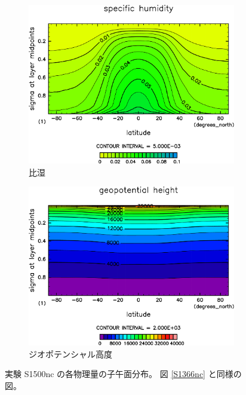 \documentclass[body]{subfiles}
\begin{document}
\begin{figure}[t]
\begin{subfigure}{.4\textwidth}
		\includegraphics[width=\textwidth]{S1500-nc/QH2OVap,time=3650:4015-crop-rotate.pdf}
		\caption{比湿\hmu*{[kg/kg]}}\label{S1500nc比湿}
	\end{subfigure}
	\begin{subfigure}{.4\textwidth}
		\centering
		\includegraphics[width=\textwidth]{S1500-nc/Height,time=3650:4015-crop-rotate.pdf}
		\caption{ジオポテンシャル高度\hmu*{[m/s]}}\label{S1500ncジオポテンシャル高度}
	\end{subfigure}
	\caption[実験 S1500nc の各物理量の子午面分布]{
		実験 S1500nc の各物理量の子午面分布。
		図 \ref{S1366nc} と同様の図。
	}\label{S1500nc}
\end{figure}
\end{document}
